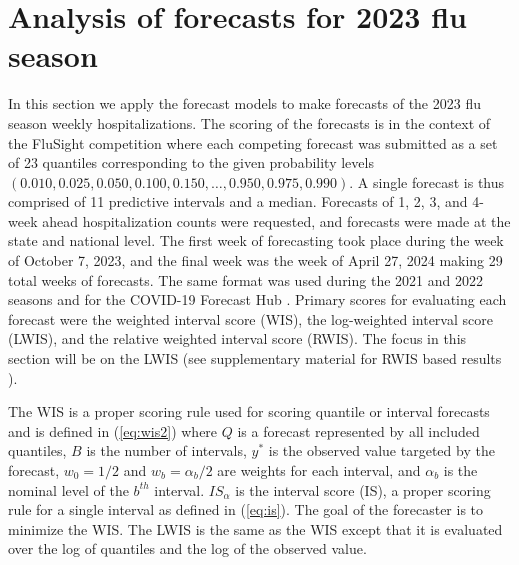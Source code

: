 \documentclass[ba]{imsart}
\theoremstyle{plain}
\theoremstyle{definition}
\theoremstyle{remark}
\begin{document}
 





























\section{Analysis of forecasts for 2023 flu season}
\label{sec:analysis}

In this section we apply the forecast models to make forecasts of the 2023 flu season weekly hospitalizations. The scoring of the forecasts is in the context of the FluSight competition where each competing forecast was submitted as a set of 23 quantiles corresponding to the given probability levels $(0.010, 0.025, 0.050, 0.100, 0.150, …, 0.950, 0.975, 0.990)$. A single forecast is thus comprised of 11 predictive intervals and a median.
Forecasts of 1, 2, 3, and 4-week ahead hospitalization counts were requested, and forecasts were made at the state and national level. The first week of forecasting took place during the week of October 7, 2023, and the final week was the week of April 27, 2024 making 29 total weeks of forecasts.
 The same format was used during the 2021 and 2022 seasons and for the COVID-19 Forecast Hub \cite[]{mathis2024evaluation, bracher2021evaluating}. 
 Primary scores for evaluating each forecast were the weighted interval score (WIS), the log-weighted interval score (LWIS), and the relative weighted interval score (RWIS). The focus in this section will be on the LWIS (see supplementary material for RWIS based results \cite[]{wadsworth2024bas}).

The WIS is a proper scoring rule used for scoring quantile or interval forecasts \cite[]{gneiting2007strictly, gneiting2014probabilistic, bracher2021evaluating} and is defined in (\ref{eq:wis2}) where $Q$ is a forecast represented by all included quantiles, $B$ is the number of intervals,  $y^*$ is the observed value targeted by the forecast, $w_0 = 1/2$ and $w_b = \alpha_b / 2$ are weights for each interval, and $\alpha_b$ is the nominal level of the $b^{th}$ interval. $IS_{\alpha}$ is the interval score (IS), a proper scoring rule for a single interval as defined in (\ref{eq:is}). The goal of the forecaster is to minimize the WIS. The LWIS is the same as the WIS except that it is evaluated over the log of quantiles and the log of the observed value. 
\end{document}
